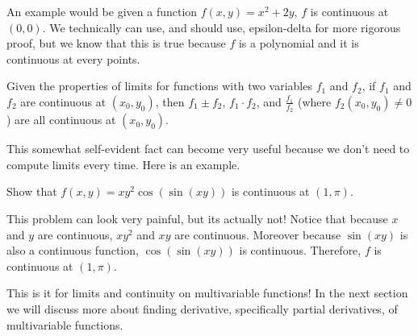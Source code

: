 \documentclass[../../../main.tex]{subfiles}
\begin{document}
An example would be given a function $f(x, y) = x^2 + 2y$,
$f$ is continuous at $(0, 0)$. We technically can use, and should use,
epsilon-delta for more rigorous proof, but we know that this is
true because $f$ is a polynomial and it is continuous at every points.

\begin{important}
Given the properties of limits for functions with two variables $f_1$
and $f_2$, if $f_1$ and $f_2$ are continuous at $(x_0, y_0)$,
then $f_1 \pm f_2$, $f_1 \cdot f_2$, and $\frac{f_1}{f_2}$
(where $f_2(x_0, y_0) \neq 0$) are all continuous at $(x_0, y_0)$.
\end{important}

This somewhat self-evident fact can become very useful because we
don't need to compute limits every time. Here is an example.

\begin{problem}{}{}
Show that $f(x, y) = xy^2 \cos(\sin(xy))$ is continuous at $(1, \pi)$.
\end{problem}
\begin{solution}
This problem can look very painful, but its actually not! Notice that
because $x$ and $y$ are continuous, $xy^2$ and $xy$ are continuous.
Moreover because $\sin(xy)$ is also a continuous function,
$\cos(\sin(xy))$ is continuous. Therefore, $f$ is continuous at
$(1, \pi)$.
\end{solution}

This is it for limits and continuity on multivariable functions!
In the next section we will discuss more about finding derivative,
specifically partial derivatives, of multivariable functions.
\end{document}
